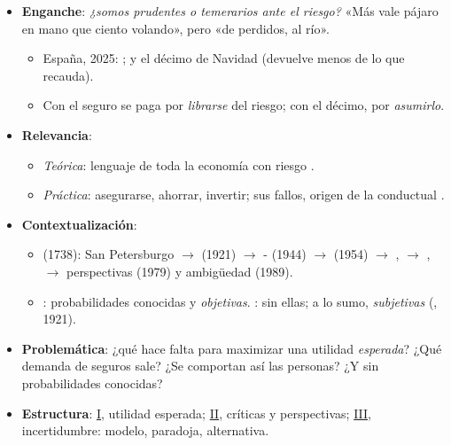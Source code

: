 \documentclass{article}
\begin{document}
\cabecerarepaso
\begin{columnas}

\begin{itemize}
\item \textbf{Enganche}: \emph{¿somos prudentes o temerarios ante el riesgo?} «Más vale pájaro en mano que ciento volando», pero «de perdidos, al río».
  \begin{itemize}
  \item España, 2025: ; y el décimo de Navidad (devuelve menos de lo que recauda).
  \item Con el seguro se paga por \emph{librarse} del riesgo; con el décimo, por \emph{asumirlo}.
  \end{itemize}
\item \textbf{Relevancia}:
  \begin{itemize}
  \item \emph{Teórica}: lenguaje de toda la economía con riesgo     .
  \item \emph{Práctica}: asegurarse, ahorrar, invertir; sus fallos, origen de la conductual .
  \end{itemize}
\item \textbf{Contextualización}:
  \begin{itemize}
  \item {} (1738): San Petersburgo $\to$  (1921) $\to$ - (1944) $\to$  (1954) $\to$ ,  $\to$ ,  $\to$ perspectivas (1979) y ambigüedad (1989).
  \item {}: probabilidades conocidas y \emph{objetivas}. : sin ellas; a lo sumo, \emph{subjetivas} (, 1921).
  \end{itemize}
\item \textbf{Problemática}: ¿qué hace falta para maximizar una utilidad \emph{esperada}? ¿Qué demanda de seguros sale? ¿Se comportan así las personas? ¿Y sin probabilidades conocidas?
\item \textbf{Estructura}: \hyperref[rep:I]{I}, utilidad esperada; \hyperref[rep:II]{II}, críticas y perspectivas; \hyperref[rep:III]{III}, incertidumbre: modelo, paradoja, alternativa.
\end{itemize}

\end{columnas}
\end{document}
